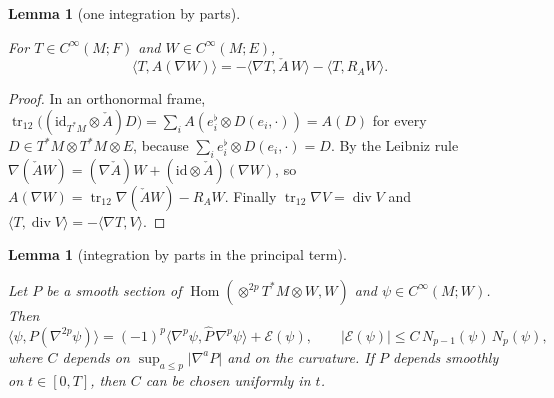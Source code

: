 \documentclass[11pt,reqno]{amsart}
\newtheorem{lemma}[theorem]{Lemma}
\theoremstyle{definition}
\theoremstyle{remark}
\newcommand{\Hom}{\operatorname{Hom}}
\newcommand{\ip}[2]{\langle #1,#2\rangle}
\newcommand{\abs}[1]{\lvert #1\rvert}
\newcommand{\hatP}{\widehat{P}}
\newcommand{\lean}[1]{}
\newcommand{\uses}[1]{}
\numberwithin{equation}{section}
\begin{document}
\begin{lemma}[one integration by parts]\label{lem:ibp-one}
\lean{ShortTime.inner_apply_covGrad, ShortTime.cometricDoubleTraceFib_comp_slotExtend_flipFib, ShortTime.covDivergence_eq_trace_covGrad}
\uses{def:flip}
For $T\in C^\infty(M;F)$ and $W\in C^\infty(M;E)$,
\[
  \ip{T}{A(\nabla W)}=-\ip{\nabla T}{\check A\,W}-\ip{T}{R_A W}.
\]
\end{lemma}

\begin{proof}
In an orthonormal frame, $\operatorname{tr}_{12}\bigl((\mathrm{id}_{T^*M}\otimes\check A)D\bigr)
=\sum_iA(e_i^\flat\otimes D(e_i,\cdot))=A(D)$ for every $D\in T^*M\otimes T^*M\otimes E$, because
$\sum_ie_i^\flat\otimes D(e_i,\cdot)=D$. By the Leibniz rule
$\nabla(\check AW)=(\nabla\check A)W+(\mathrm{id}\otimes\check A)(\nabla W)$, so
$A(\nabla W)=\operatorname{tr}_{12}\nabla(\check AW)-R_AW$. Finally
$\operatorname{tr}_{12}\nabla V=\operatorname{div}V$ and $\ip{T}{\operatorname{div}V}=-\ip{\nabla T}{V}$.
\end{proof}

\begin{lemma}[integration by parts in the principal term]\label{lem:ibp}
\lean{ShortTime.principal_ibp, ShortTime.principal_iter, ShortTime.evalFirst_flipIter, ShortTime.legendreForm_eq_fiberInner_flipIter}
\uses{def:legendre, def:sobolev, lem:ibp-one}
Let $P$ be a smooth section of $\Hom(\otimes^{2p}T^*M\otimes W,W)$ and $\psi\in C^\infty(M;W)$. Then
\[
  \ip{\psi}{P(\nabla^{2p}\psi)}=(-1)^p\ip{\nabla^p\psi}{\hatP\,\nabla^p\psi}+\mathcal E(\psi),
  \qquad
  \abs{\mathcal E(\psi)}\le C\,N_{p-1}(\psi)\,N_p(\psi),
\]
where $C$ depends on $\sup_{a\le p}\abs{\nabla^aP}$ and on the curvature. If $P$ depends smoothly on
$t\in[0,T]$, then $C$ can be chosen uniformly in $t$.
\end{lemma}
\end{document}
